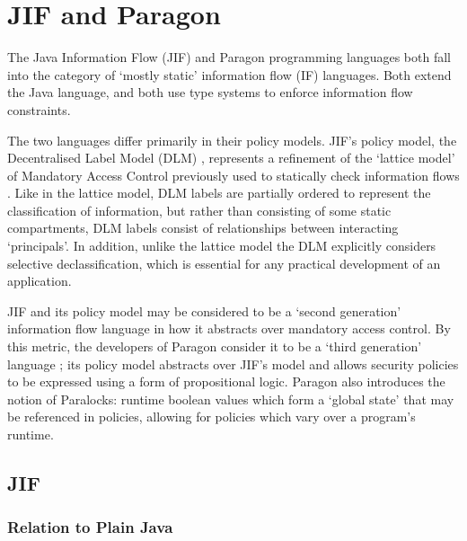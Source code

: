 \chapter{JIF and Paragon} \label{intro_to_jif_para}


The Java Information Flow (JIF) and Paragon programming languages both fall into the category of `mostly static' information flow (IF) languages. Both extend the Java language, and both use type systems to enforce information flow constraints.

The two languages differ primarily in their policy models. JIF's policy model, the Decentralised Label Model (DLM) \cite{myers2000dlm}, represents a refinement of the `lattice model' of Mandatory Access Control previously used to statically check information flows \cite{denning1977certification}. Like in the lattice model, DLM labels are partially ordered to represent the classification of information, but rather than consisting of some static compartments, DLM labels consist of relationships between interacting `principals'. In addition, unlike the lattice model the DLM explicitly considers selective declassification, which is essential for any practical development of an application.

JIF and its policy model may be considered to be a `second generation' information flow language in how it abstracts over mandatory access control. By this metric, the developers of Paragon consider it to be a `third generation' language \cite{broberg2013paragon}; its policy model abstracts over JIF's model and allows security policies to be expressed using a form of propositional logic. Paragon also introduces the notion of Paralocks: runtime boolean values which form a `global state' that may be referenced in policies, allowing for policies which vary over a program's runtime.

\newpage

\section{JIF}

\subsection{Relation to Plain Java}

